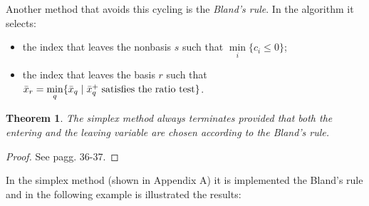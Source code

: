 \documentclass[a4paper,10 pt,titlepage,twoside]{report}
\theoremstyle{plain}
\newtheorem*{theorem*}{Theorem}
\theoremstyle{definition}
\theoremstyle{remark}
\begin{document}
Another method that avoids this cycling is the \textit{Bland's rule}. In the algorithm it selects:
\begin{itemize}
	\item the index that leaves the nonbasis $s$ such that $\min\limits_{i}\{c_{i}\leq0\}$;
\item the index that leaves the basis $r$ such that $\bar{x}_{r} = \min\limits_{q}\{\bar{x}_{q}\;|\;\bar{x}_{q}^{+} \text{\;satisfies the ratio test} \}$. \end{itemize} 
\begin{theorem*}
	The simplex method always terminates provided that both the entering and the leaving variable are chosen according to the Bland's rule.
\end{theorem*}
\begin{proof}
See \cite{LP} pagg. 36-37.	
\end{proof}
In the simplex method (shown in Appendix A) it is implemented the Bland's rule and in the following example is illustrated the results:
\end{document}
